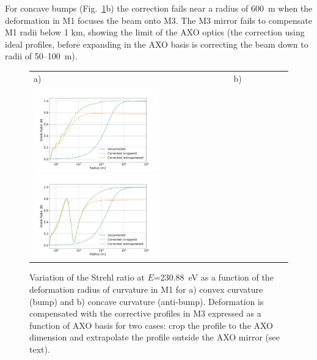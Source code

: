 \documentclass[preprint]{iucr}
\newcommand{\todo}[1]{{\color{red}[TODO: "#1'']}}
\begin{document}
For concave bumps (Fig.~\ref{fig:strehlRatioVersusR}b) the correction fails near a radius of 600~m when the deformation in M1 focuses the beam onto M3. The M3 mirror fails to compensate M1 radii below 1 km, showing the limit of the AXO optics (the correction using ideal profiles, before expanding in the AXO basis is correcting the beam down to radii of 50--100~m).

 
 

  \begin{figure}
  \label{fig:strehlRatioVersusR} 
  \begin{center}
  \begin{tabular}{l} 
  a)~~~~~~~~~~~~~~~~~~~~~~~~~~~~~~~~~~~~~~~~~~~~~b) \\
  \includegraphics[width=0.5\textwidth]{figures/scan_peak_vs_negative_radius.png}
    \includegraphics[width=0.5\textwidth]{figures/scan_peak_vs_positive_radius.png} 
  
  \end{tabular}
  \end{center}
  \caption{
Variation of the Strehl ratio at $E$=230.88~eV as a function of the deformation radius of curvature in M1 for a) convex curvature (bump) and b) concave curvature (anti-bump). Deformation is compensated with the corrective profiles in M3 expressed as a function of AXO basis for two cases: crop the profile to the AXO dimension and extrapolate the profile outside the AXO mirror (see text).}
  \end{figure} 
\end{document}
